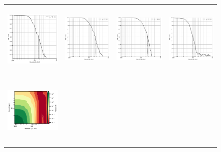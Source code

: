 \begin{figure}[t!]
\begin{center}
\begin{tabular}{cccc}
\includegraphics[trim={0 0 0 0}, clip, width=3.70cm,height=3.5cm]{00_Oceanbench/content/figures/fourdvarnet_figs/osse_gf_nadir_1d_psd_score.png} &
\hspace{1mm}\includegraphics[trim={18mm 0 0 0},clip, width=3.3cm,height=3.5cm]{00_Oceanbench/content/figures/fourdvarnet_figs/osse_gf_nadirswot_1d_psd_score.png} &
\hspace{-4mm}\includegraphics[trim={18mm 0 0 0},clip, width=3.3cm,height=3.5cm]{00_Oceanbench/content/figures/fourdvarnet_figs/osse_gf_nadir_sst_1d_psd_score.png} &
\hspace{-10mm}\includegraphics[trim={18mm 0 0 0},clip,width=3.3cm,height=3.5cm]{00_Oceanbench/content/figures/fourdvarnet_figs/ose_gf_1d_psd_score.png} \\
\hspace{-4mm}\includegraphics[trim={0 0 23mm 0},clip, width=3.65cm,height=3.5cm]{00_Oceanbench/content/figures/fourdvarnet_figs/osse_gf_nadir_psd_spacetime.png} &

\end{tabular}
\end{center}
\end{figure}

